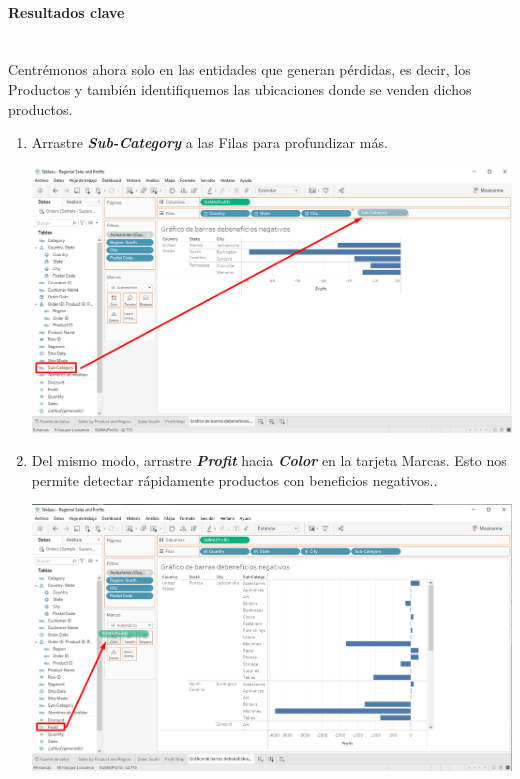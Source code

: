 \documentclass[12pt,letterpaper]{article}
\begin{document}
    \paragraph{\Large Resultados clave\\ \\}
    Centrémonos ahora solo en las entidades que generan pérdidas, es decir, los Productos y también identifiquemos las ubicaciones donde se venden dichos productos.
    \begin{enumerate}
        \item Arrastre \textit{\textbf{Sub-Category}} a las Filas para profundizar más.
        \begin{center}
            \includegraphics[width=15cm]{./img/img57.png}
        \end{center}
        \item Del mismo modo, arrastre \textit{\textbf{Profit}} hacia \textit{\textbf{Color}} en la tarjeta Marcas. Esto nos permite detectar rápidamente productos con beneficios negativos..
        \begin{center}
            \includegraphics[width=15cm]{./img/img58.png}
        \end{center}

\end{enumerate}
\end{document}

